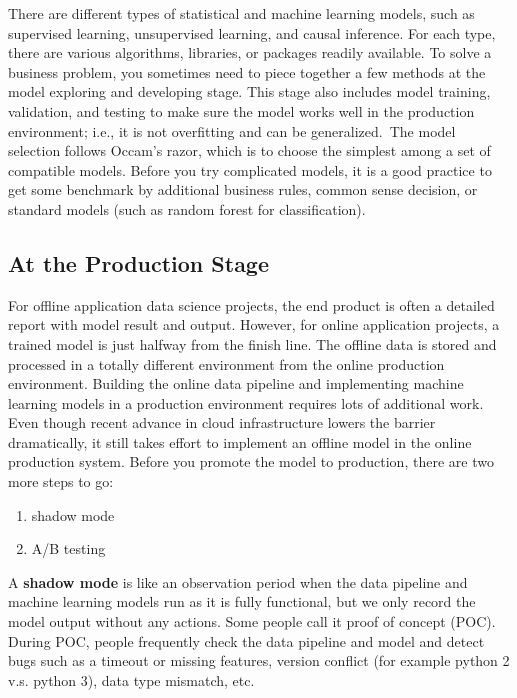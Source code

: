 \documentclass[12pt,]{krantz}
\providecommand{\tightlist}{%
  \setlength{\itemsep}{0pt}\setlength{\parskip}{0pt}}
\begin{document}
There are different types of statistical and machine learning models, such as supervised learning, unsupervised learning, and causal inference. For each type, there are various algorithms, libraries, or packages readily available. To solve a business problem, you sometimes need to piece together a few methods at the model exploring and developing stage. This stage also includes model training, validation, and testing to make sure the model works well in the production environment; i.e., it is not overfitting and can be generalized.~The model selection follows Occam's razor, which is to choose the simplest among a set of compatible models. Before you try complicated models, it is a good practice to get some benchmark by additional business rules, common sense decision, or standard models (such as random forest for classification).

\hypertarget{at-the-production-stage}{%
\subsection{At the Production Stage}\label{at-the-production-stage}}

For offline application data science projects, the end product is often a detailed report with model result and output. However, for online application projects, a trained model is just halfway from the finish line. The offline data is stored and processed in a totally different environment from the online production environment. Building the online data pipeline and implementing machine learning models in a production environment requires lots of additional work. Even though recent advance in cloud infrastructure lowers the barrier dramatically, it still takes effort to implement an offline model in the online production system. Before you promote the model to production, there are two more steps to go:

\begin{enumerate}
\def\labelenumi{\arabic{enumi}.}
\tightlist
\item
  shadow mode
\item
  A/B testing
\end{enumerate}

A \textbf{shadow mode} is like an observation period when the data pipeline and machine learning models run as it is fully functional, but we only record the model output without any actions. Some people call it proof of concept (POC). During POC, people frequently check the data pipeline and model and detect bugs such as a timeout or missing features, version conflict (for example python 2 v.s. python 3), data type mismatch, etc.
\end{document}
